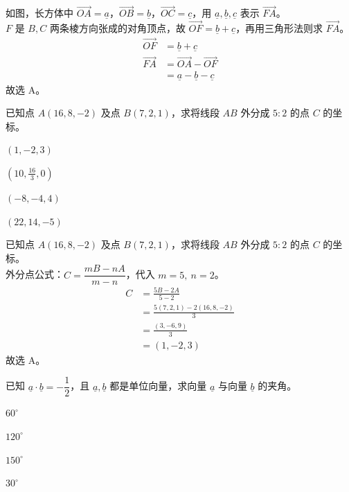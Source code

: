 \documentclass[12pt,a4paper]{exam-zh}
\begin{document}
\begin{solution}
    如图，长方体中 $\overrightarrow{OA}=\underline{a}$，$\overrightarrow{OB}=\underline{b}$，$\overrightarrow{OC}=\underline{c}$，用 $\underline{a},\underline{b},\underline{c}$ 表示 $\overrightarrow{FA}$。 \\
    $F$ 是 $B,C$ 两条棱方向张成的对角顶点，故 $\overrightarrow{OF}=\underline{b}+\underline{c}$，再用三角形法则求 $\overrightarrow{FA}$。 \\
    \begin{align*}
        \overrightarrow{OF} &= \underline{b}+\underline{c} \\
        \overrightarrow{FA} &= \overrightarrow{OA}-\overrightarrow{OF} \\
        &= \underline{a}-\underline{b}-\underline{c}
    \end{align*}
    故选 A。
\end{solution}

\begin{question}
    已知点 $A(16,8,-2)$ 及点 $B(7,2,1)$，求将线段 $AB$ 外分成 $5:2$ 的点 $C$ 的坐标。 \paren[2]
    \begin{choices}
        \item $(1,-2,3)$
        \item $(10,\frac{16}{3},0)$
        \item $(-8,-4,4)$
        \item $(22,14,-5)$
    \end{choices}
\end{question}

\begin{solution}
    已知点 $A(16,8,-2)$ 及点 $B(7,2,1)$，求将线段 $AB$ 外分成 $5:2$ 的点 $C$ 的坐标。 \\
    外分点公式：$C=\dfrac{mB-nA}{m-n}$，代入 $m=5,\ n=2$。 \\
    \begin{align*}
        C &= \frac{5B-2A}{5-2} \\
        &= \frac{5(7,2,1)-2(16,8,-2)}{3} \\
        &= \frac{(3,-6,9)}{3} \\
        &= (1,-2,3)
    \end{align*}
    故选 A。
\end{solution}

\begin{question}
    已知 $\underline{a}\cdot\underline{b}=-\dfrac12$，且 $\underline{a},\underline{b}$ 都是单位向量，求向量 $\underline{a}$ 与向量 $\underline{b}$ 的夹角。 \paren[2]
    \begin{choices}
        \item $60^\circ$
        \item $120^\circ$
        \item $150^\circ$
        \item $30^\circ$
    \end{choices}
\end{question}
\end{document}
